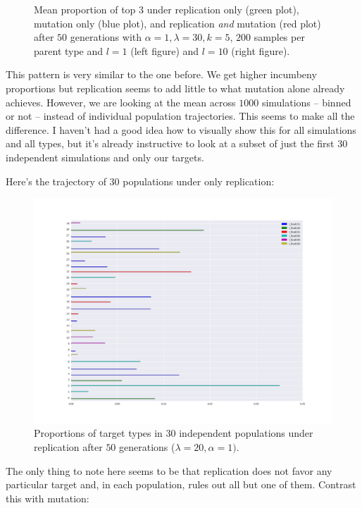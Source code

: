 \documentclass[a4paper]{article}
\begin{document}
\begin{figure}[h!]
\begin{subfigure}[b]{0.45\textwidth}
  \end{subfigure}
  \caption{Mean proportion of top $3$ under replication only (green plot), mutation only (blue plot), and replication {\em and} mutation (red plot) after $50$ generations with $\alpha = 1, \lambda = 30, k = 5$, $200$ samples per parent type and $l = 1$ (left figure) and $l = 10$ (right figure).}
\end{figure}

This pattern is very similar to the one before. We get higher incumbeny proportions but replication seems to add little to what mutation alone already achieves. However, we are looking at the mean across $1000$ simulations -- binned or not -- instead of individual population trajectories. This seems to make all the difference. I haven't had a good idea how to visually show this for all simulations and all types, but it's already instructive to look at a subset of just the first $30$ independent simulations and only our targets.

Here's the trajectory of $30$ populations under only replication:


\begin{figure}[h!]
  \centering
  \includegraphics[scale=.45]{../code-LOT-extension/plots/r-lam30-a1-k15-s200-l10-meFalse432-nomean.png} %
  \caption{Proportions of target types in $30$ independent populations under replication after $50$ generations ($\lambda = 20, \alpha = 1)$.}
\end{figure}

The only thing to note here seems to be that replication does not favor any particular target and, in each population, rules out all but one of them. Contrast this with mutation:
\end{document}
